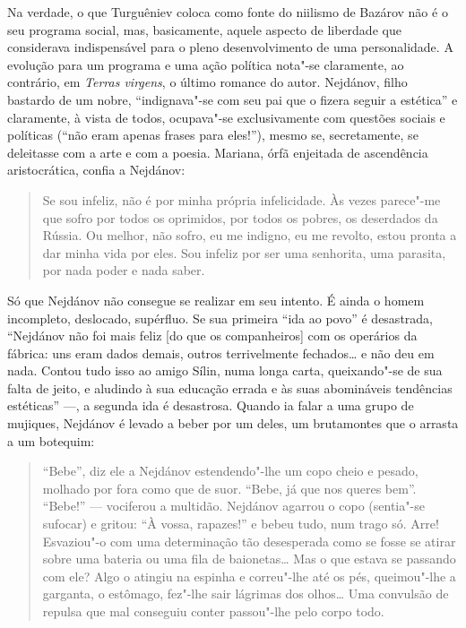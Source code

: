 Na verdade, o que Turguêniev coloca como fonte do niilismo de
Bazárov não é o seu programa social, mas, basicamente, aquele aspecto
de liberdade que considerava indispensável para o pleno desenvolvimento
de uma personalidade. A evolução para um programa e uma ação política
nota"-se claramente, ao contrário, em \emph{Terras virgens}, o último
romance do autor. Nejdánov, filho bastardo de um nobre, ``indignava"-se
com seu pai que o fizera seguir a estética'' e claramente, à vista de
todos, ocupava"-se exclusivamente com questões sociais e políticas (``não
eram apenas frases para eles!''), mesmo se, secretamente, se deleitasse
com a arte e com a poesia. Mariana, órfã enjeitada de ascendência
aristocrática, confia a Nejdánov:

\begin{quote}
Se sou infeliz, não é por minha própria infelicidade. Às vezes parece"-me que sofro por todos os oprimidos, por todos os pobres, os deserdados da Rússia. Ou melhor, não sofro, eu me indigno, eu me revolto, estou pronta a dar minha vida por eles. Sou infeliz por ser uma senhorita, uma parasita, por nada poder e nada saber.
\end{quote}

Só que Nejdánov não consegue se realizar em seu intento. É ainda o homem incompleto, deslocado, supérfluo. Se sua primeira ``ida ao povo'' é desastrada, ``Nejdánov não foi mais feliz [do que os companheiros] com os operários da fábrica: uns eram dados demais, outros terrivelmente fechados\ldots{} e não deu em nada. Contou tudo isso ao amigo Sílin, numa longa carta, queixando"-se de sua falta de jeito, e aludindo à sua educação errada e às suas abomináveis tendências estéticas'' ---, a segunda ida é desastrosa. Quando ia falar a uma grupo de mujiques, Nejdánov é levado a beber por um deles, um brutamontes que o arrasta a um botequim:

\begin{quote}
``Bebe'', diz ele a Nejdánov estendendo"-lhe um copo cheio e pesado, molhado por fora como que de suor. ``Bebe, já que nos queres bem''. ``Bebe!'' --- vociferou a multidão. Nejdánov agarrou o copo (sentia"-se sufocar) e gritou: ``À vossa, rapazes!'' e bebeu tudo, num trago só. Arre! Esvaziou"-o com uma determinação tão desesperada como se fosse se atirar sobre uma bateria ou uma fila de baionetas\ldots{} Mas o que estava se passando com ele? Algo o atingiu na espinha e correu"-lhe até os pés, queimou"-lhe a
garganta, o estômago, fez"-lhe sair lágrimas dos olhos\ldots{} Uma convulsão de repulsa que mal conseguiu conter passou"-lhe pelo corpo todo.
\end{quote}

